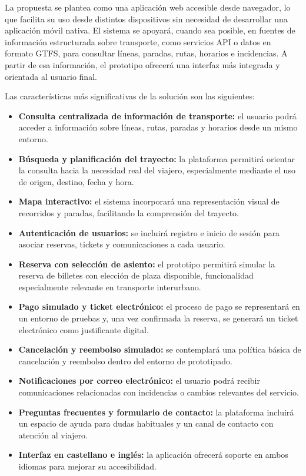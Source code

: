 La propuesta se plantea como una aplicación web accesible desde navegador, lo que facilita su uso desde distintos dispositivos sin necesidad de desarrollar una aplicación móvil nativa. El sistema se apoyará, cuando sea posible, en fuentes de información estructurada sobre transporte, como servicios API o datos en formato GTFS, para consultar líneas, paradas, rutas, horarios e incidencias. A partir de esa información, el prototipo ofrecerá una interfaz más integrada y orientada al usuario final.

Las características más significativas de la solución son las siguientes:

\begin{itemize}
    \item \textbf{Consulta centralizada de información de transporte:} el usuario podrá acceder a información sobre líneas, rutas, paradas y horarios desde un mismo entorno.
    \item \textbf{Búsqueda y planificación del trayecto:} la plataforma permitirá orientar la consulta hacia la necesidad real del viajero, especialmente mediante el uso de origen, destino, fecha y hora.
    \item \textbf{Mapa interactivo:} el sistema incorporará una representación visual de recorridos y paradas, facilitando la comprensión del trayecto.
    \item \textbf{Autenticación de usuarios:} se incluirá registro e inicio de sesión para asociar reservas, tickets y comunicaciones a cada usuario.
    \item \textbf{Reserva con selección de asiento:} el prototipo permitirá simular la reserva de billetes con elección de plaza disponible, funcionalidad especialmente relevante en transporte interurbano.
    \item \textbf{Pago simulado y ticket electrónico:} el proceso de pago se representará en un entorno de pruebas y, una vez confirmada la reserva, se generará un ticket electrónico como justificante digital.
    \item \textbf{Cancelación y reembolso simulado:} se contemplará una política básica de cancelación y reembolso dentro del entorno de prototipado.
    \item \textbf{Notificaciones por correo electrónico:} el usuario podrá recibir comunicaciones relacionadas con incidencias o cambios relevantes del servicio.
    \item \textbf{Preguntas frecuentes y formulario de contacto:} la plataforma incluirá un espacio de ayuda para dudas habituales y un canal de contacto con atención al viajero.
    \item \textbf{Interfaz en castellano e inglés:} la aplicación ofrecerá soporte en ambos idiomas para mejorar su accesibilidad.
\end{itemize}

